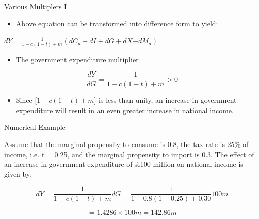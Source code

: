 \documentclass[10pt,hyperref={CJKbookmarks=true},xcolor=dvipsnames,aspectratio=169]{beamer}
\begin{document}
\begin{frame}{Various Multiplers I}

\begin{itemize}
\item Above equation can be transformed into difference form to yield:
\end{itemize}

\begin{center}
$dY=\frac{1}{1-c(1-t)+m}\left(dC_{a}+dI+dG+dX\text{−}dM_{a}\right)$
\par\end{center}
\begin{itemize}
\item The government expenditure multiplier
\end{itemize}

\[
\frac{dY}{dG}=\frac{1}{1-c(1-t)+m}>0
\]

\begin{itemize}
\item Since {[}$1-c(1-t)+m${]} is less than unity, an increase in government
expenditure will result in an even greater increase in national income.
\end{itemize}
\end{frame}

\begin{frame}{Numerical Example}

\begin{exampleblock}{Assume that the marginal propensity to consume is 0.8, the tax rate
is 25\% of income, i.e. t = 0.25, and the marginal propensity to import
is 0.3. The effect of an increase in government expenditure of £100
million on national income is given by:}

\end{exampleblock}
\[
dY=\frac{1}{1-c(1-t)+m}dG=\frac{1}{1-0.8\left(1-0.25\right)+0.30}100m
\]


\[
=1.4286\times100m=142.86m
\]

\end{frame}
\end{document}
